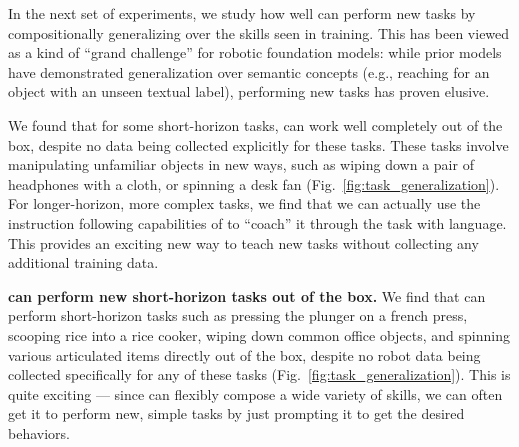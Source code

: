 
\label{sec:compositional_generalization}

In the next set of experiments, we study how well \MethodName{} can perform new tasks by compositionally generalizing over the skills seen in training. This has been viewed as a kind of ``grand challenge'' for robotic foundation models: while prior models have demonstrated generalization over semantic concepts (e.g., reaching for an object with an unseen textual label), performing new tasks has proven elusive.

We found that for some short-horizon tasks, \MethodName{} can work well completely out of the box, despite no data being collected explicitly for these tasks. These tasks involve manipulating unfamiliar objects in new ways, such as wiping down a pair of headphones with a cloth, or spinning a desk fan (Fig.~\ref{fig:task_generalization}). For longer-horizon, more complex tasks, we find that we can actually use the instruction following capabilities of \MethodName{} to ``coach'' it through the task with language. This provides an exciting new way to teach \MethodName{} new tasks without collecting any additional training data.

\noindent \textbf{\MethodName{} can perform new short-horizon tasks out of the box. }
We find that \MethodName{} can perform short-horizon tasks such as pressing the plunger on a french press, scooping rice into a rice cooker, wiping down common office objects, and spinning various articulated items directly out of the box, despite no robot data being collected specifically for any of these tasks (Fig.~\ref{fig:task_generalization}). This is quite exciting --- since \MethodName{} can flexibly compose a wide variety of skills, we can often get it to perform new, simple tasks by just prompting it to get the desired behaviors.

